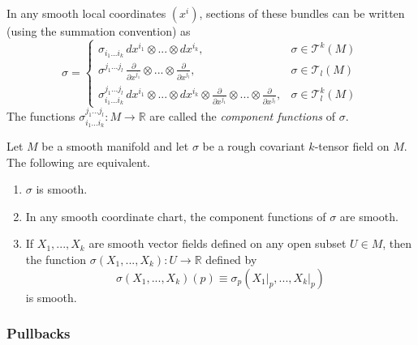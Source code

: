 \documentclass{article}
\begin{document}
    In any smooth local coordinates $(x^i)$, sections of these bundles can be written (using the summation convention) as
    \begin{equation}
      \sigma = \begin{cases}
                \sigma_{i_1 ... i_k} \, dx^{i_1} \otimes ... \otimes dx^{i_k}, & \sigma \in \mathcal{T}^k (M) \\
                \sigma^{j_1 ... j_l} \, \frac{\partial}{\partial x^{j_1}} \otimes ... \otimes \frac{\partial}{\partial x^{j_l}}, & \sigma \in \mathcal{T}_l (M) \\
                \sigma_{i_1 ... i_k}^{j_1 ... j_l} \, dx^{i_1} \otimes ... \otimes dx^{i_k} \otimes \frac{\partial}{\partial x^{j_1}} \otimes ... \otimes \frac{\partial}{\partial x^{j_l}}, & \sigma \in \mathcal{T}^k_l (M)
          \end{cases}
    \end{equation}
    The functions $\sigma_{i_1 ... i_k}^{j_1 ... j_l} : M \to \mathbb{R}$ are called the \textit{component functions} of $\sigma$. 

    \begin{lemma}
      \label{thm:smoothness-criteria-for-a-tensor-field}
    Let $M$ be a smooth manifold and let $\sigma$ be a rough covariant $k$-tensor field on $M$. The following are equivalent.
    \begin{enumerate}
        \item $\sigma$ is smooth. 
        \item In any smooth coordinate chart, the component functions of $\sigma$ are smooth. 
        \item If $X_1, ..., X_k$ are smooth vector fields defined on any open subset $U \in M$, then the function $\sigma(X_1, ..., X_k): U \to \mathbb{R}$ defined by 
        \begin{equation}
          \sigma(X_1, ..., X_k) (p) \equiv \sigma_p (X_1 \big|_p, ..., X_k \big|_p)
        \end{equation}
        is smooth. 
    \end{enumerate}
    \end{lemma}

    \subsubsection{Pullbacks}
\end{document}
